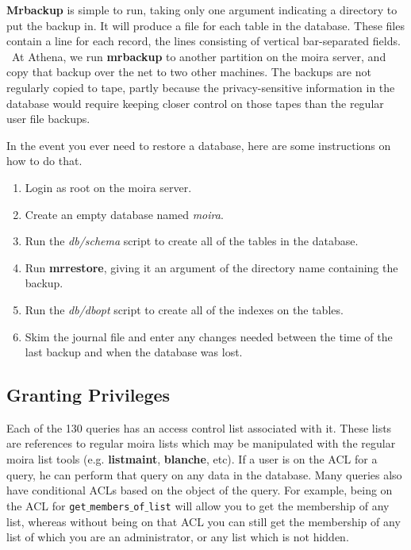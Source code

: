 \documentclass{book}
\begin{document}
{\bf Mrbackup} is simple to run, taking only one argument indicating a
directory to put the backup in.   It will produce a file for each
table in the database.  These files contain a line for each record,
the lines consisting of vertical bar-separated fields.  \athena\ At
Athena, we run {\bf mrbackup} to another partition on the moira server,
and copy that backup over the net to two other machines.  The backups
are not regularly copied to tape, partly because the privacy-sensitive
information in the database would require keeping closer control on
those tapes than the regular user file backups.

In the event you ever need to restore a database, here are some
instructions on how to do that.
\begin{enumerate}
\item Login as root on the moira server.
\item Create an empty database named {\em moira}.
\item Run the {\em db/schema} script to create all of the tables in the
database.
\item Run {\bf mrrestore}, giving it an argument of the directory name
containing the backup.
\item Run the {\em db/dbopt} script to create all of the indexes on the
tables.
\item Skim the journal file and enter any changes needed between the time of
the last backup and when the database was lost.
\end{enumerate}

\subsection{Granting Privileges}

Each of the 130 queries has an access control list associated with it.
These lists are references to regular moira lists which may be
manipulated with the regular moira list tools (e.g. {\bf listmaint},
{\bf blanche}, etc).  If a user is on the ACL for a query, he can
perform that query on any data in the database.  Many queries also
have conditional ACLs based on the object of the query.  For example,
being on the ACL for {\tt get$\_$members$\_$of$\_$list} will allow you
to get the membership of any list, whereas without being on that ACL
you can still get the membership of any list of which you are an
administrator, or any list which is not hidden.
\end{document}
